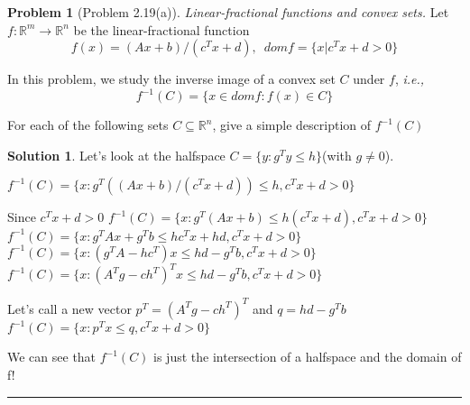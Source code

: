 \documentclass{article}
\theoremstyle{definition}
\newtheorem{problem}{Problem}
\def\fline{\rule{0.75\linewidth}{0.5pt}}
\newcommand{\finishline}{\begin{center}\fline\end{center}}
\newtheorem*{solution*}{Solution}
\newenvironment{solution}{\begin{solution*}}{{\finishline} \end{solution*}}
\begin{document}
\begin{problem} [Problem 2.19(a)]
    \textit{Linear-fractional functions and convex sets.} Let $f: \mathbb{R}^m \rightarrow \mathbb{R}^n$ be the linear-fractional function
    \begin{equation}
        f(x) = (Ax + b) / (c^Tx + d), \enspace dom f = \{x | c^Tx + d > 0\}
    \end{equation}

    In this problem, we study the inverse image of a convex set $C$ under $f$, \textit{i.e.,}
    \begin{equation}
        f^{-1}(C) = \{x \in dom f : f(x) \in C\}
    \end{equation}

    For each of the following sets $C \subseteq \mathbb{R}^n $, give a simple description of $f^{-1}(C)$

    \begin{solution}
        Let's look at the halfspace $C = \{y : g^Ty \leq h\}$(with $g\neq 0$). 

        $f^{-1}(C) = \{x :  g^T ((Ax + b) / (c^Tx + d)) \leq h, c^Tx + d > 0 \}$ \newline 

        Since $c^Tx + d > 0$ \newline 
        $f^{-1}(C) = \{ x :  g^T (Ax + b) \leq h(c^Tx + d), c^Tx + d > 0 \}$ \newline 
        $f^{-1}(C) = \{ x :  g^TAx + g^Tb \leq hc^Tx + hd, c^Tx + d > 0 \}$ \newline
        $f^{-1}(C) = \{ x :  (g^TA - hc^T)x \leq hd - g^Tb, c^Tx + d > 0 \}$ \newline
        $f^{-1}(C) = \{ x :  (A^Tg - ch^T)^T x \leq hd - g^Tb, c^Tx + d > 0 \}$ \newline

        Let's call a new vector $p^T = (A^Tg - ch^T)^T$ and $q = hd - g^Tb$ \newline 
        $f^{-1}(C) = \{ x :  p^T x \leq q, c^Tx + d > 0 \}$ \newline

        We can see that $f^{-1}(C)$ is just the intersection of a halfspace and the domain of f!
    \end{solution}
\end{problem}
\end{document}
